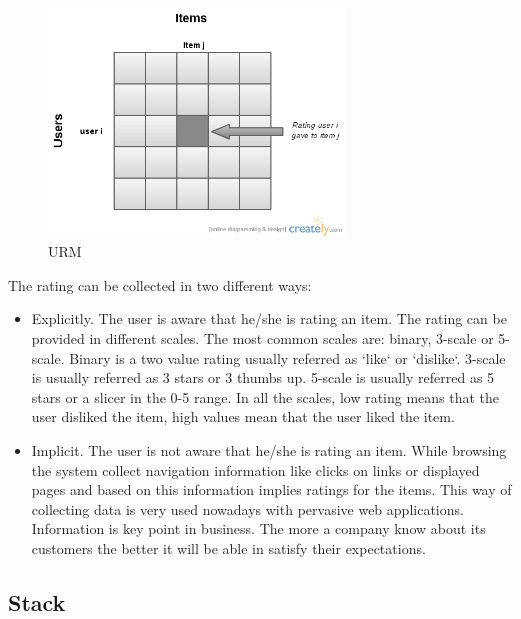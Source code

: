 \begin{itemize}
  \begin{figure}
    \centering
    \includegraphics[width=0.7\textwidth]{figures/URM.png}
    \caption{URM}
    \label{fig:URM}
  \end{figure}

The rating can be collected in two different ways:
\begin{itemize}
\item Explicitly. The user is aware that he/she is rating an item. The rating can be provided in different scales. The most common scales are: binary, 3-scale or 5-scale. Binary is a two value rating usually referred as `like` or `dislike`. 3-scale is usually referred as 3 stars or 3 thumbs up. 5-scale is usually referred as 5 stars or a slicer in the 0-5 range. In all the scales, low rating means that the user disliked the item, high values mean that the user liked the item.
\item Implicit. The user is not aware that he/she is rating an item. While browsing the system collect navigation information like clicks on links or displayed pages and based on this information implies ratings for the items. This way of collecting data is very used nowadays with pervasive web applications. Information is key point in business. The more a company know about its customers the better it will be able in satisfy their expectations. 
\end{itemize}
\end{itemize}

\subsection{Stack}
\label{sec:Stack}

